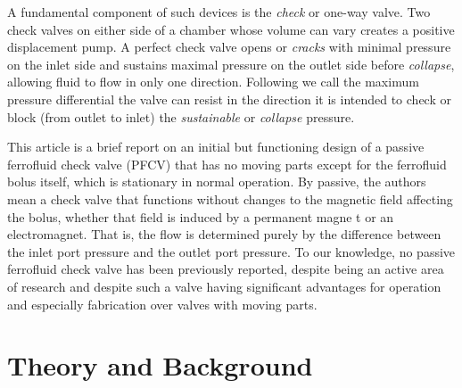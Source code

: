 \documentclass[]{asme2ej}
\begin{document}
A fundamental component of such
devices is the {\em check} or one-way valve.
Two check
valves on either side of a chamber whose volume can vary creates a
positive displacement pump.
A perfect check valve opens or
{\em cracks} with minimal pressure on the inlet side and sustains maximal
pressure on the outlet side before {\em collapse},
allowing fluid to flow in only one
direction. Following\cite{hartshorne2004ferrofluid} we call the maximum pressure
differential the valve can resist in the direction it is intended to
check or block (from outlet to inlet) the {\em sustainable} or {\em collapse} pressure.

This article is a brief report on an initial but functioning design of a
passive ferrofluid check valve (PFCV) that has no moving
parts except for the ferrofluid bolus itself, which is stationary
in normal operation.
By passive, the authors
mean a check valve that functions without changes to the magnetic
field affecting the bolus, whether that field is induced by a
permanent magne t or an electromagnet.
That is, the flow is determined
purely by the difference between the inlet port pressure and the
outlet port pressure.
To our knowledge, no passive
ferrofluid check valve has been previously reported, despite being an
active area of research and despite such a valve having
significant advantages for operation and especially
fabrication over valves with moving parts.

\section{Theory and Background}
\end{document}
